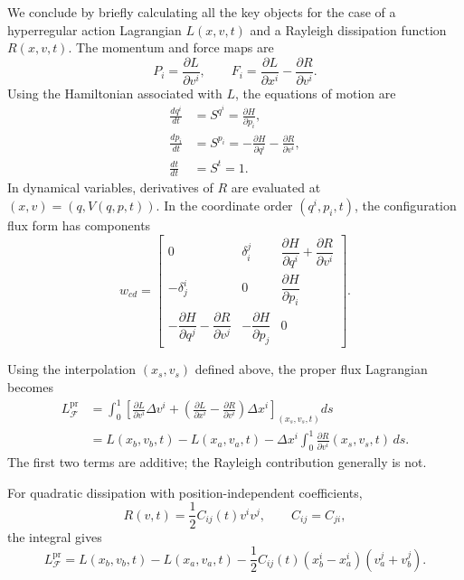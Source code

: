 \documentclass[nofootinbib,aps,pre]{revtex4-2}
\begin{document}
We conclude by briefly calculating all the key objects for the case of a hyperregular action Lagrangian $L(x,v,t)$ and a Rayleigh dissipation function $R(x,v,t)$. The momentum and force maps are
\begin{equation}
	P_i=\frac{\partial L}{\partial v^i},
	\qquad
	F_i=\frac{\partial L}{\partial x^i}
	-\frac{\partial R}{\partial v^i}.
\end{equation}
Using the Hamiltonian associated with $L$, the equations of motion are
\begin{equation}
	\begin{aligned}
		\frac{dq^i}{dt}&=S^{q^i}=\frac{\partial H}{\partial p_i},\\
		\frac{dp_i}{dt}&=S^{p_i}=-\frac{\partial H}{\partial q^i}
		-\frac{\partial R}{\partial v^i},\\
		\frac{dt}{dt}&=S^t=1.
	\end{aligned}
\end{equation}
In dynamical variables, derivatives of $R$ are evaluated at
$(x,v)=(q,V(q,p,t))$. In the coordinate order $(q^i,p_i,t)$,
the configuration flux form has components
\begin{equation}
	w_{cd}=
	\begin{bmatrix}
		0 & \delta_i^j &
		\dfrac{\partial H}{\partial q^i}
		+\dfrac{\partial R}{\partial v^i}\\
		-\delta_j^i & 0 &
		\dfrac{\partial H}{\partial p_i}\\
		-\dfrac{\partial H}{\partial q^j}
		-\dfrac{\partial R}{\partial v^j} &
		-\dfrac{\partial H}{\partial p_j} & 0
	\end{bmatrix}.
\end{equation}

Using the interpolation $(x_s,v_s)$ defined above, the proper flux
Lagrangian becomes
\begin{equation}
	\begin{aligned}
		L_{\mathcal F}^{\mathrm{pr}}
		&=\int_0^1
		\left[
		\frac{\partial L}{\partial v^i}\Delta v^i
		+
		\left(
		\frac{\partial L}{\partial x^i}
		-\frac{\partial R}{\partial v^i}
		\right)\Delta x^i
		\right]_{(x_s,v_s,t)}ds\\
		&=L(x_b,v_b,t)-L(x_a,v_a,t)
		-\Delta x^i\int_0^1
		\frac{\partial R}{\partial v^i}(x_s,v_s,t)\,ds.
	\end{aligned}
\end{equation}
The first two terms are additive; the Rayleigh contribution
generally is not.

For quadratic dissipation with position-independent coefficients,
\begin{equation}
	R(v,t)=\frac12 C_{ij}(t)v^iv^j,
	\qquad C_{ij}=C_{ji},
\end{equation}
the integral gives
\begin{equation}
	L_{\mathcal F}^{\mathrm{pr}}
	=L(x_b,v_b,t)-L(x_a,v_a,t)
	-\frac12 C_{ij}(t)(x_b^i-x_a^i)(v_a^j+v_b^j).
\end{equation}
\end{document}
